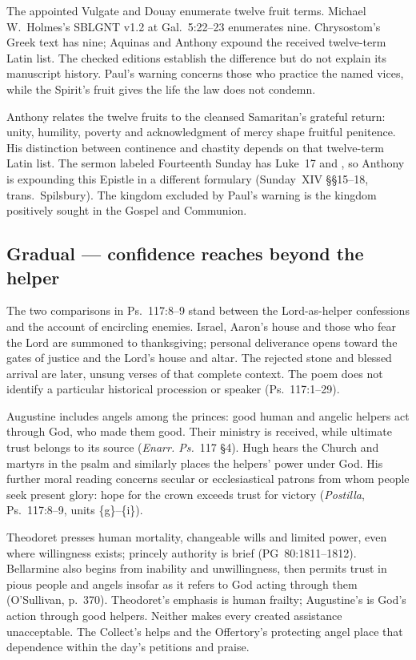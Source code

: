 The appointed Vulgate and Douay enumerate twelve fruit terms. Michael
W.~Holmes's SBLGNT v1.2 at Gal.~5:22--23 enumerates nine. Chrysostom's Greek text has nine;
Aquinas and Anthony expound the received twelve-term Latin list. The checked
editions establish the difference but do not explain its manuscript history.
Paul's warning concerns those who practice the named vices, while the
Spirit's fruit gives the life the law does not condemn.

Anthony relates the twelve fruits to the cleansed Samaritan's grateful return:
unity, humility, poverty and acknowledgment of mercy shape fruitful
penitence. His distinction between continence and chastity depends on that
twelve-term Latin list. The sermon labeled Fourteenth Sunday has Luke~17 and
, so Anthony is expounding this Epistle in a different
formulary (Sunday~XIV §§15--18, trans.~Spilsbury). The kingdom excluded by
Paul's warning is the kingdom positively sought in the Gospel and Communion.

\subsection*{Gradual --- confidence reaches beyond the helper\enspace{}}\label{gradual-treatment}

The two comparisons in Ps.~117:8--9 stand between the Lord-as-helper
confessions and the account of encircling enemies. Israel, Aaron's house and
those who fear the Lord are summoned to thanksgiving; personal deliverance
opens toward the gates of justice and the Lord's house and altar. The
rejected stone and blessed arrival are later, unsung verses of that complete
context. The poem does not identify a particular historical procession or
speaker (Ps.~117:1--29).

Augustine includes angels among the princes: good human and angelic helpers
act through God, who made them good. Their ministry is received, while
ultimate trust belongs to its source (\emph{Enarr. Ps.}~117 §4).
Hugh hears the Church and martyrs in the psalm and similarly places the
helpers' power under God. His further moral reading concerns secular or
ecclesiastical patrons from whom people seek present glory: hope for the
crown exceeds trust for victory (\emph{Postilla}, Ps.~117:8--9,
units \{g\}--\{i\}).

Theodoret presses human mortality, changeable wills and limited power, even
where willingness exists; princely authority is brief (PG~80:1811--1812).
Bellarmine also begins from inability and unwillingness, then permits trust
in pious people and angels insofar as it refers to God acting through them
(O'Sullivan, p.~370). Theodoret's emphasis is human frailty; Augustine's is
God's action through good helpers. Neither makes every created assistance
unacceptable. The Collect's helps and the Offertory's protecting angel place
that dependence within the day's petitions and praise.

